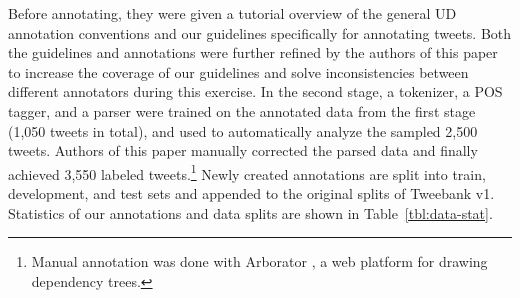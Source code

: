 \documentclass[11pt,a4paper]{article}
\begin{document}
Before annotating, they were given a tutorial overview of the general UD
annotation conventions and our guidelines specifically for annotating tweets.
Both the guidelines and annotations
were further refined by the authors of this paper to increase
the coverage of our guidelines and solve inconsistencies between
different annotators during this exercise. In the second stage, a tokenizer, a POS tagger, and a
parser were trained on the annotated data from the first stage (1,050 tweets in total),
and used to automatically analyze the sampled 2,500 tweets.  Authors 
of this paper manually corrected the parsed data and finally achieved 3,550 labeled tweets.\footnote{Manual annotation was done with Arborator \cite{gerdes:2013:W13-37}, a web platform for drawing dependency trees.}
Newly created annotations are split into train, development, and test sets and appended
to the original splits of {\sc Tweebank v1}. Statistics of our annotations and data splits are shown
in Table~\ref{tbl:data-stat}.

\end{document}
